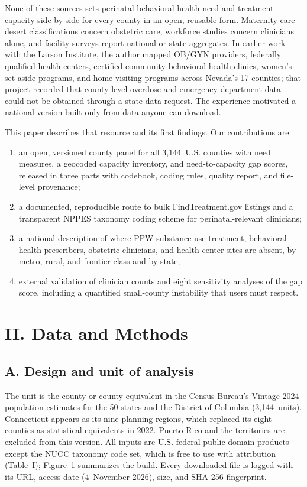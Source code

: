 \documentclass{article}
\begin{document}
None of these sources sets perinatal behavioral health need and treatment capacity side by side for every county in an open, reusable form. Maternity care desert classifications concern obstetric care, workforce studies concern clinicians alone, and facility surveys report national or state aggregates. In earlier work with the Larson Institute, the author mapped OB/GYN providers, federally qualified health centers, certified community behavioral health clinics, women's set-aside programs, and home visiting programs across Nevada's 17 counties; that project recorded that county-level overdose and emergency department data could not be obtained through a state data request. The experience motivated a national version built only from data anyone can download.

This paper describes that resource and its first findings. Our contributions are:
\begin{enumerate}
\item an open, versioned county panel for all 3,144\ U.S. counties with need measures, a geocoded capacity inventory, and need-to-capacity gap scores, released in three parts with codebook, coding rules, quality report, and file-level provenance;
\item a documented, reproducible route to bulk FindTreatment.gov listings and a transparent NPPES taxonomy coding scheme for perinatal-relevant clinicians;
\item a national description of where PPW substance use treatment, behavioral health prescribers, obstetric clinicians, and health center sites are absent, by metro, rural, and frontier class and by state;
\item external validation of clinician counts and eight sensitivity analyses of the gap score, including a quantified small-county instability that users must respect.
\end{enumerate}

\section*{II. Data and Methods}

\subsection*{A. Design and unit of analysis}

The unit is the county or county-equivalent in the Census Bureau's Vintage 2024 population estimates for the 50 states and the District of Columbia (3,144\ units). Connecticut appears as its nine planning regions, which replaced its eight counties as statistical equivalents in 2022. Puerto Rico and the territories are excluded from this version. All inputs are U.S. federal public-domain products except the NUCC taxonomy code set, which is free to use with attribution (Table~I); Figure~1 summarizes the build. Every downloaded file is logged with its URL, access date (4~November 2026), size, and SHA-256 fingerprint.
\end{document}
